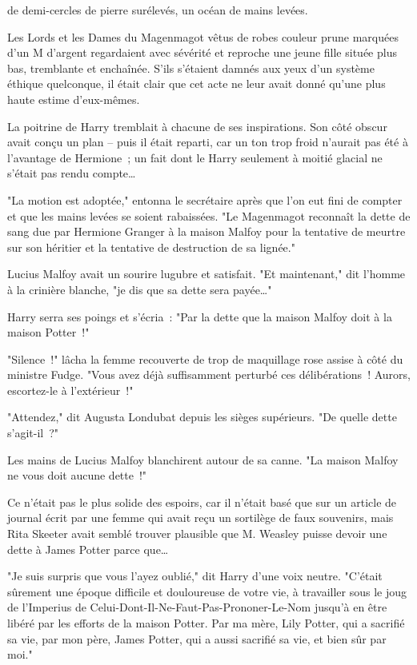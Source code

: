 
 de demi-cercles de pierre surélevés, un océan de mains levées.

\hplettrineextrapara
Les Lords et les Dames du Magenmagot vêtus de robes couleur prune marquées d'un M d'argent regardaient avec sévérité et reproche une jeune fille située plus bas, tremblante et enchaînée. S'ils s'étaient damnés aux yeux d'un système éthique quelconque, il était clair que cet acte ne leur avait donné qu'une plus haute estime d'eux-mêmes.

La poitrine de Harry tremblait à chacune de ses inspirations. Son côté obscur avait conçu un plan -- puis il était reparti, car un ton trop froid n'aurait pas été à l'avantage de Hermione~; un fait dont le Harry seulement à moitié glacial ne s'était pas rendu compte…

"La motion est adoptée," entonna le secrétaire après que l'on eut fini de compter et que les mains levées se soient rabaissées. "Le Magenmagot reconnaît la dette de sang due par Hermione Granger à la maison Malfoy pour la tentative de meurtre sur son héritier et la tentative de destruction de sa lignée."

Lucius Malfoy avait un sourire lugubre et satisfait. "Et maintenant," dit l'homme à la crinière blanche, "je dis que sa dette sera payée…"

Harry serra ses poings et s'écria~: "Par la dette que la maison Malfoy doit à la maison Potter~!"

"Silence~!" lâcha la femme recouverte de trop de maquillage rose assise à côté du ministre Fudge. "Vous avez déjà suffisamment perturbé ces délibérations~! Aurors, escortez-le à l'extérieur~!"

"Attendez," dit Augusta Londubat depuis les sièges supérieurs. "De quelle dette s'agit-il~?"

Les mains de Lucius Malfoy blanchirent autour de sa canne. "La maison Malfoy ne vous doit aucune dette~!"

Ce n'était pas le plus solide des espoirs, car il n'était basé que sur un article de journal écrit par une femme qui avait reçu un sortilège de faux souvenirs, mais Rita Skeeter avait semblé trouver plausible que M. Weasley puisse devoir une dette à James Potter parce que…

"Je suis surpris que vous l'ayez oublié," dit Harry d'une voix neutre. "C'était sûrement une époque difficile et douloureuse de votre vie, à travailler sous le joug de l'Imperius de Celui-Dont-Il-Ne-Faut-Pas-Prononer-Le-Nom jusqu'à en être libéré par les efforts de la maison Potter. Par ma mère, Lily Potter, qui a sacrifié sa vie, par mon père, James Potter, qui a aussi sacrifié sa vie, et bien sûr par moi."


